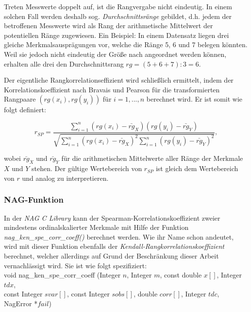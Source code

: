 Treten Messwerte doppelt auf, ist die Rangvergabe nicht eindeutig. In einem solchen Fall werden deshalb sog. {\it Durchschnittsränge} gebildet, d.h. jedem der betroffenen Messwerte wird als Rang der arithmetische Mittelwert der potentiellen Ränge zugewiesen. Ein Beispiel: In einem Datensatz liegen drei gleiche Merkmalsausprägungen vor, welche die Ränge 5, 6 und 7 belegen könnten. Weil sie jedoch nicht eindeutig der Größe nach angeordnet werden können, erhalten alle drei den Durchschnittsrang $rg=(5+6+7):3=6$.

Der eigentliche Rangkorrelationseffizient wird schließlich ermittelt, indem der Korrelationskoeffizient nach Bravais und Pearson für die transformierten Rangpaare $(rg(x_i), rg(y_i))$ für $i=1,...,n$ berechnet wird. Er ist somit wie folgt definiert:

\begin{equation*}
    r_{SP}=\dfrac{\sum_{i=1}^{n}{(rg(x_i)-\bar{rg}_X)(rg(y_i)-\bar{rg}_Y)}}{\sqrt{\sum_{i=1}^{n}{(rg(x_i)-\bar{rg}_X)^2\sum_{i=1}^{n}{(rg(y_i)-\bar{rg}_Y)^2}}}},
\end{equation*}

\noindent wobei $\bar{rg}_X$ und $\bar{rg}_Y$ für die arithmetischen Mittelwerte aller Ränge der Merkmale $X$ und $Y$ stehen. Der gültige Wertebereich von $r_{SP}$ ist gleich dem Wertebereich von $r$ und analog zu interpretieren.

\subsubsection{NAG-Funktion}

In der {\it NAG C Library} kann der Spearman-Korrelationskoeffizient zweier mindestens ordinalskalierter Merkmale mit Hilfe der Funktion {\it nag\_ken\_spe\_corr\_coeff()} berechnet werden. Wie ihr Name schon andeutet, wird mit dieser Funktion ebenfalls der {\it Kendall-Rangkorrelationskoeffizient} berechnet, welcher allerdings auf Grund der Beschränkung dieser Arbeit vernachlässigt wird. Sie ist wie folgt spezifiziert:\\

\noindent void nag\_ken\_spe\_corr\_coeff (Integer $n$, Integer $m$, const double $x[]$, Integer $tdx$,\\
\hspace*{5mm} const Integer $svar[]$, const Integer $sobs[]$, double $corr[]$, Integer $tdc$,\\
\hspace*{5mm} NagError *$fail$)\\

